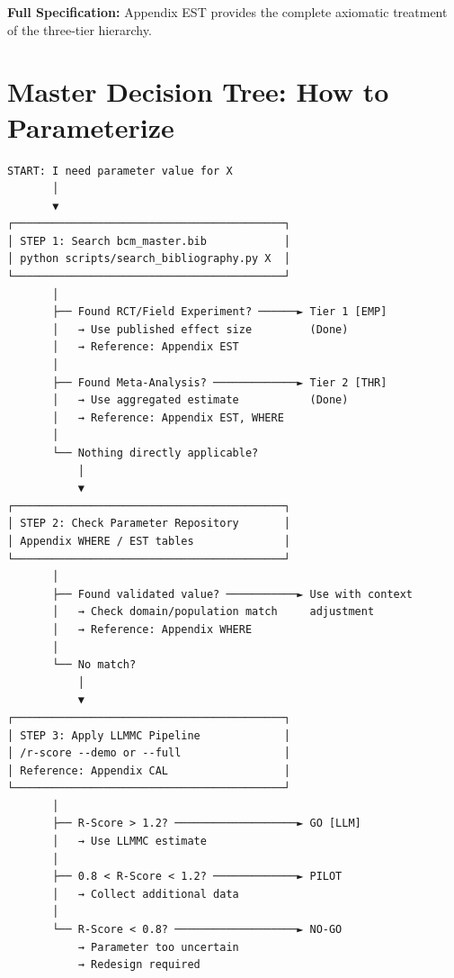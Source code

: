 \textbf{Full Specification:} Appendix EST provides the complete axiomatic treatment of the three-tier hierarchy.


\section{Master Decision Tree: How to Parameterize}
\label{sec:pm-decision-tree}

\begin{tcolorbox}[colback=yellow!5!white, colframe=yellow!75!black, title=The Parameterization Decision Tree]
\begin{verbatim}
START: I need parameter value for X
       │
       ▼
┌──────────────────────────────────────────┐
│ STEP 1: Search bcm_master.bib            │
│ python scripts/search_bibliography.py X  │
└──────────────────────────────────────────┘
       │
       ├── Found RCT/Field Experiment? ──────► Tier 1 [EMP]
       │   → Use published effect size         (Done)
       │   → Reference: Appendix EST
       │
       ├── Found Meta-Analysis? ─────────────► Tier 2 [THR]
       │   → Use aggregated estimate           (Done)
       │   → Reference: Appendix EST, WHERE
       │
       └── Nothing directly applicable?
           │
           ▼
┌──────────────────────────────────────────┐
│ STEP 2: Check Parameter Repository       │
│ Appendix WHERE / EST tables              │
└──────────────────────────────────────────┘
       │
       ├── Found validated value? ───────────► Use with context
       │   → Check domain/population match     adjustment
       │   → Reference: Appendix WHERE
       │
       └── No match?
           │
           ▼
┌──────────────────────────────────────────┐
│ STEP 3: Apply LLMMC Pipeline             │
│ /r-score --demo or --full                │
│ Reference: Appendix CAL                  │
└──────────────────────────────────────────┘
       │
       ├── R-Score > 1.2? ───────────────────► GO [LLM]
       │   → Use LLMMC estimate
       │
       ├── 0.8 < R-Score < 1.2? ─────────────► PILOT
       │   → Collect additional data
       │
       └── R-Score < 0.8? ───────────────────► NO-GO
           → Parameter too uncertain
           → Redesign required
\end{verbatim}
\end{tcolorbox}

